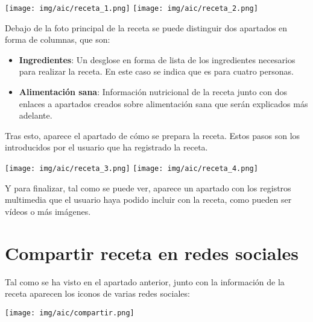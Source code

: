 \documentclass{\ClassPath/viu-tfm-template}
\begin{document}
\begin{center}
    \vspace{-10pt}
    \texttt{[image: img/aic/receta\_1.png]}
    \texttt{[image: img/aic/receta\_2.png]}
    \vspace{-20pt}
\end{center}

Debajo de la foto principal de la receta se puede distinguir dos apartados en forma de columnas, que son:

\begin{itemize}
    \item \textbf{Ingredientes}: Un desglose en forma de lista de los ingredientes necesarios para realizar la receta. En este caso se indica que es para cuatro personas.
    \item \textbf{Alimentación sana}: Información nutricional de la receta junto con dos enlaces a apartados creados sobre alimentación sana que serán explicados más adelante.
\end{itemize}

Tras esto, aparece el apartado de cómo se prepara la receta. Estos pasos son los introducidos por el usuario que ha registrado la receta.


\begin{center}
    \vspace{-10pt}
    \texttt{[image: img/aic/receta\_3.png]}
    \texttt{[image: img/aic/receta\_4.png]}
    \vspace{-20pt}
\end{center}

Y para finalizar, tal como se puede ver, aparece un apartado con los registros multimedia que el usuario haya podido incluir con la receta, como pueden ser vídeos o más imágenes.


\section{Compartir receta en redes sociales}

Tal como se ha visto en el apartado anterior, junto con la información de la receta aparecen los iconos de varias redes sociales:

\begin{center}
    \vspace{-10pt}
    \texttt{[image: img/aic/compartir.png]}
    \vspace{-20pt}
\end{center}
\end{document}
